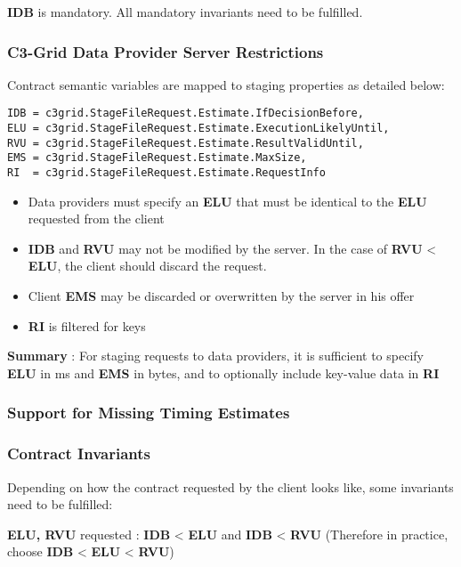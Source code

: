 \documentclass{article}
\begin{document}
\textbf{IDB} is mandatory. All mandatory invariants need to be
fulfilled.

\subsubsection{C3-Grid Data Provider Server Restrictions}

Contract semantic variables are mapped to staging properties as
detailed below:

\begin{verbatim}
IDB = c3grid.StageFileRequest.Estimate.IfDecisionBefore, 
ELU = c3grid.StageFileRequest.Estimate.ExecutionLikelyUntil, 
RVU = c3grid.StageFileRequest.Estimate.ResultValidUntil, 
EMS = c3grid.StageFileRequest.Estimate.MaxSize, 
RI  = c3grid.StageFileRequest.Estimate.RequestInfo
\end{verbatim}
\begin{itemize}
\item
  Data providers must specify an \textbf{ELU} that must be identical
  to the \textbf{ELU} requested from the client
\item
  \textbf{IDB} and \textbf{RVU} may not be modified by the server. In
  the case of \textbf{RVU} \textless{} \textbf{ELU}, the client
  should discard the request.
\item
  Client \textbf{EMS} may be discarded or overwritten by the server
  in his offer
\item
  \textbf{RI} is filtered for keys
\end{itemize}
\textbf{Summary} : For staging requests to data providers, it is
sufficient to specify \textbf{ELU} in ms and \textbf{EMS} in bytes,
and to optionally include key-value data in \textbf{RI}

\subsubsection{Support for Missing Timing Estimates}

\subsubsection{Contract Invariants}

Depending on how the contract requested by the client looks like,
some invariants need to be fulfilled:

\textbf{ELU, RVU} requested : \textbf{IDB} \textless{} \textbf{ELU}
and \textbf{IDB} \textless{} \textbf{RVU} (Therefore in practice,
choose \textbf{IDB} \textless{} \textbf{ELU} \textless{}
\textbf{RVU})
\end{document}
